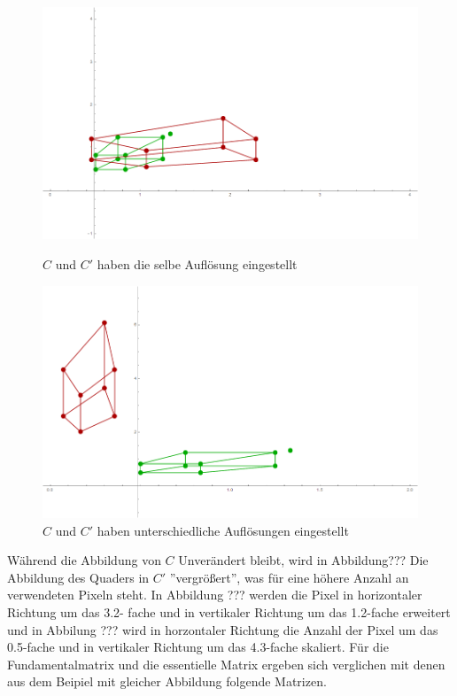\begin{figure}[!htb]
	\includegraphics[width=\linewidth]{images/Zeta32_12.png}
	\caption{$C$ und $C'$ haben die selbe Auflösung eingestellt}
	\label{fig:awesome_image1}
	\endminipage\hfill
	\includegraphics[width=\linewidth]{images/Zeta05_43.png}
	\caption{$C$ und $C'$ haben unterschiedliche Auflösungen eingestellt}
	\label{fig:awesome_image2}
	\endminipage\hfill
\end{figure}




Während die Abbildung von $C$ Unverändert bleibt, wird in Abbildung??? Die Abbildung des Quaders in $C'$ ''vergrößert'', was für eine höhere Anzahl an verwendeten Pixeln steht. In Abbildung ??? werden die Pixel in horizontaler Richtung um das 3.2- fache und in vertikaler Richtung um das 1.2-fache erweitert und in Abbilung ??? wird in horzontaler Richtung die Anzahl der Pixel um das 0.5-fache und in vertikaler Richtung um das 4.3-fache skaliert. Für die Fundamentalmatrix und die essentielle Matrix ergeben sich verglichen mit denen aus dem Beipiel mit gleicher Abbildung folgende Matrizen.\\


